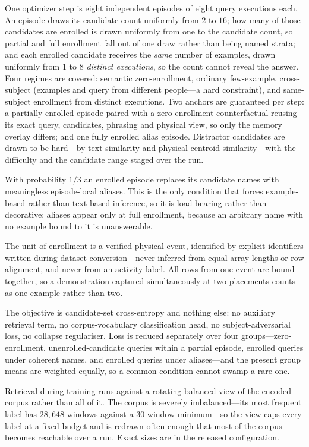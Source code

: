 One optimizer step is eight independent episodes of eight query executions each. An episode draws
its candidate count uniformly from $2$ to $16$; how many of those candidates are enrolled is drawn
uniformly from one to the candidate count, so partial and full enrollment fall out of one draw
rather than being named strata; and each enrolled candidate receives the \emph{same} number of
examples, drawn uniformly from $1$ to $8$ \emph{distinct executions}, so the count cannot reveal
the answer. Four regimes are covered: semantic zero-enrollment, ordinary few-example, cross-subject
(examples and query from different people---a hard constraint), and same-subject enrollment from
distinct executions. Two anchors are guaranteed per step: a partially enrolled episode paired with
a zero-enrollment counterfactual reusing its exact query, candidates, phrasing and physical view,
so only the memory overlay differs; and one fully enrolled alias episode. Distractor candidates are
drawn to be hard---by text similarity and physical-centroid similarity---with the difficulty and the
candidate range staged over the run.

With probability $1/3$ an enrolled episode replaces its candidate names with meaningless
episode-local aliases. This is the only condition that forces example-based rather than text-based
inference, so it is load-bearing rather than decorative; aliases appear only at full enrollment,
because an arbitrary name with no example bound to it is unanswerable.

The unit of enrollment is a verified physical event, identified by explicit identifiers written
during dataset conversion---never inferred from equal array lengths or row alignment, and never
from an activity label. All rows from one event are bound together, so a demonstration captured
simultaneously at two placements counts as one example rather than two.

The objective is candidate-set cross-entropy and nothing else: no auxiliary retrieval term, no
corpus-vocabulary classification head, no subject-adversarial loss, no collapse regulariser. Loss
is reduced separately over four groups---zero-enrollment, unenrolled-candidate queries within a
partial episode, enrolled queries under coherent names, and enrolled queries under aliases---and the
present group means are weighted equally, so a common condition cannot swamp a rare one.

Retrieval during training runs against a rotating balanced view of the encoded corpus rather than
all of it. The corpus is severely imbalanced---its most frequent label has $28{,}648$ windows
against a $30$-window minimum---so the view caps every label at a fixed budget and is redrawn
often enough that most of the corpus becomes reachable over a run. Exact sizes are in the released
configuration.

